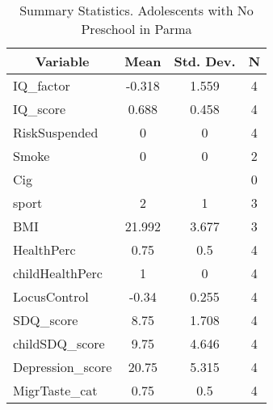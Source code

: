 
\begin{table}[htbp]\centering \caption{Summary Statistics. Adolescents with No Preschool in Parma \label{bothAdolmaternaNoneParma}}
\begin{tabular}{l c c  c}\hline\hline
\multicolumn{1}{c}{\textbf{Variable}} & \textbf{Mean}
 & \textbf{Std. Dev.} & \textbf{N}\\ \hline
IQ\_factor & -0.318 & 1.559  & 4\\
IQ\_score & 0.688 & 0.458  & 4\\
RiskSuspended & 0 & 0  & 4\\
Smoke & 0 & 0  & 2\\
Cig &  &   & 0\\
sport & 2 & 1  & 3\\
BMI & 21.992 & 3.677  & 3\\
HealthPerc & 0.75 & 0.5  & 4\\
childHealthPerc & 1 & 0  & 4\\
LocusControl & -0.34 & 0.255  & 4\\
SDQ\_score & 8.75 & 1.708  & 4\\
childSDQ\_score & 9.75 & 4.646  & 4\\
Depression\_score & 20.75 & 5.315  & 4\\
MigrTaste\_cat & 0.75 & 0.5  & 4\\
\hline\end{tabular}
\end{table}
